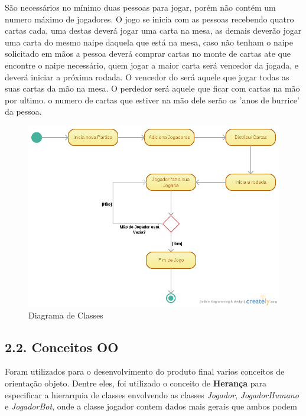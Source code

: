 \documentclass[12pt, a4paper]{article}
\begin{document}
  São necessários no mínimo duas pessoas para jogar, porém não contém um numero máximo de jogadores. O jogo se inicia com as pessoas recebendo quatro cartas cada, uma destas deverá jogar uma carta na mesa, as demais deverão jogar uma carta do mesmo naipe daquela que está na mesa, caso não tenham o naipe solicitado em mãos a pessoa deverá comprar cartas no monte de cartas ate que encontre o naipe necessário, quem jogar a maior carta será  vencedor da jogada, e deverá iniciar a próxima rodada. O vencedor do será aquele que jogar todas as suas cartas da mão na mesa. O perdedor será aquele que ficar com cartas na mão por ultimo. o numero de cartas que estiver na mão dele serão os 'anos de burrice' da pessoa.


  \begin{figure}[!htb]
   \centering
   \includegraphics[scale=0.5]{DiagramaAtividadesBurro}
   \caption{Diagrama de Classes}
   \label{Rotulo}
  \end{figure}

   \subsection*{2.2. Conceitos OO}
    Foram utilizados para o desenvolvimento do produto final varios conceitos de orientação objeto.
    Dentre eles, foi utilizado o conceito de \textbf{Herança} para especificar a hierarquia de classes envolvendo as classes
    \textit{Jogador}, \textit{JogadorHumano} e \textit{JogadorBot}, onde a classe jogador contem dados mais gerais que ambos podem
\end{document}
